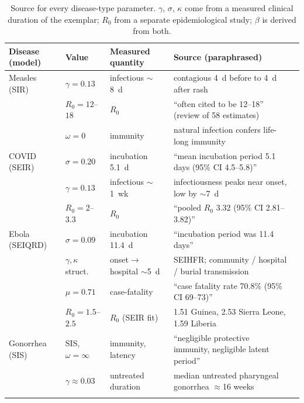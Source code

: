 \begin{table}[H]
\centering
\footnotesize
\caption{Source for every disease-type parameter. $\gamma$, $\sigma$, $\kappa$ come from a measured
clinical duration of the exemplar; $R_0$ from a separate epidemiological study; $\beta$ is derived
from both.}
\label{tab:sources}
\begin{tabular}{@{}llll>{\raggedright\arraybackslash}p{7.4cm}@{}}
\toprule
Disease (model) & Value & Measured quantity & Source (paraphrased) \\
\midrule
Measles (SIR) & $\gamma=0.13$ & infectious $\sim$8~d & contagious 4~d before to 4~d after rash~\cite{cdc:measles} \\
              & $R_0=12$--$18$ & $R_0$ & ``often cited to be 12--18'' (review of 58 estimates)~\cite{guerra:measles} \\
              & $\omega=0$ & immunity & natural infection confers life-long immunity~\cite{cdc:measles} \\
\addlinespace
COVID (SEIR) & $\sigma=0.20$ & incubation 5.1~d & ``mean incubation period 5.1 days (95\% CI 4.5--5.8)''~\cite{lauer:incubation} \\
             & $\gamma=0.13$ & infectious $\sim$1~wk & infectiousness peaks near onset, low by $\sim$7~d~\cite{he:shedding} \\
             & $R_0=2$--$3.3$ & $R_0$ & ``pooled $R_0$ 3.32 (95\% CI 2.81--3.82)''~\cite{alimohamadi:covidr0} \\
\addlinespace
Ebola (SEIQRD) & $\sigma=0.09$ & incubation 11.4~d & ``incubation period was 11.4 days''~\cite{whoebola2014} \\
               & $\gamma,\kappa$ struct. & onset$\rightarrow$hospital $\sim$5~d & SEIHFR; community / hospital / burial transmission~\cite{legrand:ebola} \\
               & $\mu=0.71$ & case-fatality & ``case fatality rate 70.8\% (95\% CI 69--73)''~\cite{whoebola2014} \\
               & $R_0=1.5$--$2.5$ & $R_0$ (SEIR fit) & 1.51 Guinea, 2.53 Sierra Leone, 1.59 Liberia~\cite{althaus:ebolar0} \\
\addlinespace
Gonorrhea (SIS) & SIS, $\omega=\infty$ & immunity, latency & ``negligible protective immunity, negligible latent period''~\cite{hethcote:gonorrhea} \\
                & $\gamma\approx0.03$ & untreated duration & median untreated pharyngeal gonorrhea $\approx$16 weeks~\cite{barbee:gonorrhea} \\
\addlinespace

\end{tabular}
\end{table}
